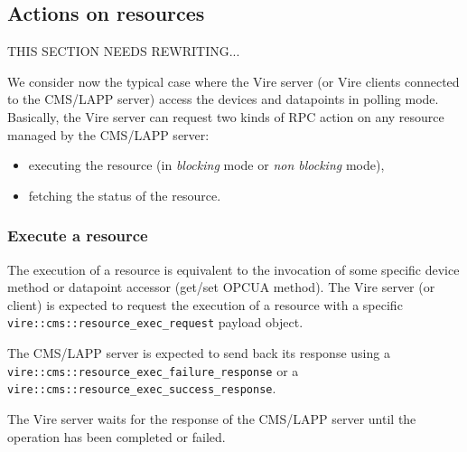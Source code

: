
\subsection{Actions on resources}
\label{sec:vire_resources:actions}

THIS SECTION NEEDS REWRITING...

We  consider now  the  typical case  where the  Vire  server (or  Vire
clients connected to the CMS/LAPP server) access the devices and datapoints
in polling mode.   Basically, the Vire server can  request two kinds
of RPC action on any resource managed by the CMS/LAPP server:

\begin{itemize}
\item executing the resource (in \emph{blocking} mode or \emph{non blocking} mode),
\item fetching the status of the resource.
\end{itemize}

\subsubsection{Execute a resource} %

The execution  of a resource is  equivalent to the invocation  of some
specific   device  method   or  datapoint   accessor  (get/set   OPCUA
method).  The Vire  server  (or  client) is  expected  to request  the
execution      of      a       resource      with      a      specific
\texttt{vire::cms::resource\_exec\_request} payload object.

The CMS/LAPP server is expected to send back its response using
a \texttt{vire::cms::resource\_exec\_failure\_response} or a
 \texttt{vire::cms::resource\_exec\_success\_response}.




The Vire server waits for the response of the  CMS/LAPP server until the  operation has
been completed or failed.

